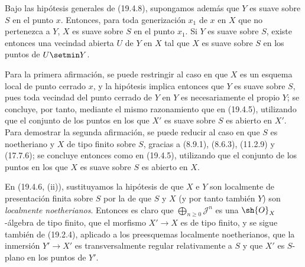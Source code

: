 \begin{corollary}[19.4.9]
\label{IV.19.4.9}
Bajo las hipótesis generales de \textup{(19.4.8)}, supongamos además que $Y$ es suave sobre $S$ en el punto $x$. Entonces, para toda generización $x_1$ de $x$ en $X$ que no pertenezca a $Y$, $X$ es suave sobre $S$ en el punto $x_1$. Si $Y$ es suave sobre $S$, existe entonces una vecindad abierta $U$ de $Y$ en $X$ tal que $X$ es suave sobre $S$ en los puntos de $U\setmin Y$.
\end{corollary}

Para la primera afirmación, se puede restringir al caso en que $X$ es un esquema local de punto cerrado $x$, y la hipótesis implica entonces que $Y$ es suave sobre $S$, pues toda vecindad del punto cerrado de $Y$ en $Y$ es necesariamente el propio $Y$; se concluye, por tanto, mediante el mismo razonamiento que en (19.4.5), utilizando que el conjunto de los puntos en los que $X'$ es suave sobre $S$ es abierto en $X'$. Para demostrar la segunda afirmación, se puede reducir al caso en que $S$ es noetheriano y $X$ de tipo finito sobre $S$, gracias a (8.9.1), (8.6.3), (11.2.9) y (17.7.6); se concluye entonces como en (19.4.5), utilizando que el conjunto de los puntos en los que $X$ es suave sobre $S$ es abierto en $X$.

\begin{remark}[19.4.10]
\label{IV.19.4.10}
En (19.4.6, (ii)), sustituyamos la hipótesis de que $X$ e $Y$ son localmente de presentación finita sobre $S$ por la de que $S$ y $X$ (y por tanto también $Y$) son \emph{localmente noetherianos}. Entonces es claro que $\bigoplus_{n\geq0}\mathscr J^n$ es una $\sh{O}_X$-álgebra de tipo finito, que el morfismo $X'\to X$ es de tipo finito, y se sigue también de (19.2.4), aplicado a los preesquemas localmente noetherianos, que la inmersión $Y'\to X'$ es transversalmente regular relativamente a $S$ y que $X'$ es $S$-plano en los puntos de $Y'$.
\end{remark}


